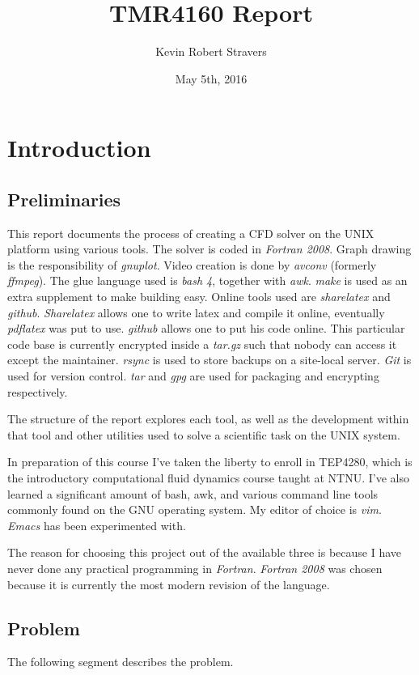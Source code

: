 \documentclass[listof=totoc]{report}
\title{TMR4160 Report}
\author{Kevin Robert Stravers}
\date{May 5th, 2016}
\begin{document}
\maketitle

\tableofcontents
\lstlistoflistings

\chapter{Introduction}
\section{Preliminaries}
This report documents the process of creating a CFD solver on the UNIX platform using various tools. The solver is coded in \emph{Fortran 2008}. Graph drawing is the responsibility of \emph{gnuplot}. Video creation is done by \emph{avconv} (formerly \emph{ffmpeg}). The glue language used is \emph{bash 4}, together with \emph{awk}. \emph{make} is used as an extra supplement to make building easy. Online tools used are \emph{sharelatex} and \emph{github}. \emph{Sharelatex} allows one to write latex and compile it online, eventually \emph{pdflatex} was put to use. \emph{github} allows one to put his code online. This particular code base is currently encrypted inside a \emph{tar.gz} such that nobody can access it except the maintainer. \emph{rsync} is used to store backups on a site-local server. \emph{Git} is used for version control. \emph{tar} and \emph{gpg} are used for packaging and encrypting respectively.

The structure of the report explores each tool, as well as the development within that tool and other utilities used to solve a scientific task on the UNIX system.

In preparation of this course I've taken the liberty to enroll in TEP4280, which is the introductory computational fluid dynamics course taught at NTNU. I've also learned a significant amount of bash, awk, and various command line tools commonly found on the GNU operating system. My editor of choice is \emph{vim}. \emph{Emacs} has been experimented with.

The reason for choosing this project out of the available three is because I have never done any practical programming in \emph{Fortran}. \emph{Fortran 2008} was chosen because it is currently the most modern revision of the language.

\section{Problem}
The following segment describes the problem.
\end{document}
